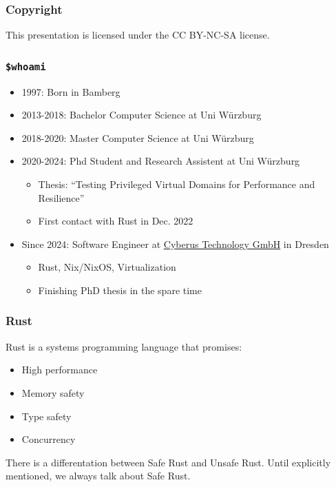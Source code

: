 \frame[plain]{\titlepage}

\begin{frame}[fragile]
    \frametitle{Copyright}
    This presentation is licensed under the CC BY-NC-SA license.
\end{frame}

\begin{frame}[fragile]
    \frametitle{\texttt{\$whoami}}
    \begin{itemize}
        \item 1997: Born in Bamberg
        \pause
        \vspace{.3cm}
        \item 2013-2018: Bachelor Computer Science at Uni Würzburg
        \item 2018-2020: Master Computer Science at Uni Würzburg
        \pause
        \vspace{.3cm}
        \item 2020-2024: Phd Student and Research Assistent at Uni Würzburg
        \begin{itemize}
            \item Thesis: ``Testing Privileged Virtual Domains for Performance and Resilience''
            \item First contact with Rust in Dec. 2022
        \end{itemize}
        \pause
        \vspace{.3cm}
        \item Since 2024: Software Engineer at \href{https://cyberus-technology.de}{Cyberus Technology GmbH} in Dresden
        \begin{itemize}
            \item Rust, Nix/NixOS, Virtualization
            \item Finishing PhD thesis in the spare time
        \end{itemize}
    \end{itemize}
\end{frame}

\begin{frame}[fragile]
    \frametitle{Rust}
    Rust is a systems programming language that promises:
    \begin{itemize}
        \item High performance
        \item Memory safety
        \item Type safety
        \item Concurrency
    \end{itemize}
    \pause
    \vfill
    There is a differentation between Safe Rust and Unsafe Rust.
    Until explicitly mentioned, we always talk about Safe Rust.
\end{frame}


